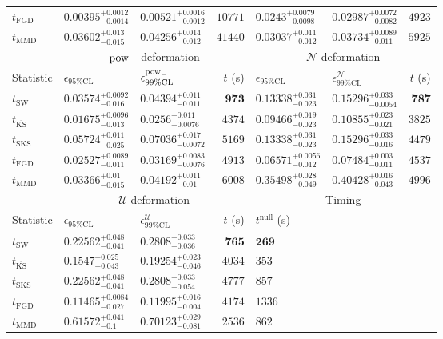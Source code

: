 \begin{tabular}{l|llr|llr}
	$t_{\mathrm{FGD}}$ & ${\mathbf{0.00395_{-0.0014}^{+0.0012}}}$ & ${\mathbf{0.00521_{-0.0012}^{+0.0016}}}$ & $10771$ & $0.0243_{-0.0098}^{+0.0079}$ & $0.02987_{-0.0082}^{+0.0072}$ & $4923$ \\
	$t_{\mathrm{MMD}}$ & $0.03602_{-0.015}^{+0.013}$ & $0.04256_{-0.012}^{+0.014}$ & $41440$ & $0.03037_{-0.012}^{+0.011}$ & $0.03734_{-0.011}^{+0.0089}$ & $5925$ \\
	\toprule
	\multicolumn{1}{c}{} & \multicolumn{3}{c}{$\rm{pow}_{-}$-deformation} & \multicolumn{3}{c}{$\mathcal{N}$-deformation} \\
	Statistic & $\epsilon_{95\%\mathrm{CL}}$ & $\epsilon^  {\rm{pow}_{-}}_{99\%\mathrm{CL}}$ & $t$ (s) & $\epsilon_{95\%\mathrm{CL}}$ & $\epsilon^    {\mathcal{N}}_{99\%\mathrm{CL}}$ & $t$ (s) \\
	\midrule
	$t_{\mathrm{SW}}$ & $0.03574_{-0.016}^{+0.0092}$ & $0.04394_{-0.011}^{+0.011}$ & ${\mathbf{973}}$ & $0.13338_{-0.023}^{+0.031}$ & $0.15296_{-0.0054}^{+0.033}$ & ${\mathbf{787}}$ \\
	$t_{\overline{\mathrm{KS}}}$ & ${\mathbf{0.01675_{-0.013}^{+0.0096}}}$ & ${\mathbf{0.0256_{-0.0076}^{+0.011}}}$ & $4374$ & $0.09466_{-0.023}^{+0.019}$ & $0.10855_{-0.021}^{+0.023}$ & $3825$ \\
	$t_{\mathrm{SKS}}$ & $0.05724_{-0.025}^{+0.011}$ & $0.07036_{-0.0072}^{+0.017}$ & $5169$ & $0.13338_{-0.023}^{+0.031}$ & $0.15296_{-0.016}^{+0.033}$ & $4479$ \\
	$t_{\mathrm{FGD}}$ & $0.02527_{-0.011}^{+0.0089}$ & $0.03169_{-0.0076}^{+0.0083}$ & $4913$ & ${\mathbf{0.06571_{-0.012}^{+0.0056}}}$ & ${\mathbf{0.07484_{-0.011}^{+0.003}}}$ & $4537$ \\
	$t_{\mathrm{MMD}}$ & $0.03366_{-0.015}^{+0.01}$ & $0.04192_{-0.01}^{+0.011}$ & $6008$ & $0.35498_{-0.049}^{+0.028}$ & $0.40428_{-0.043}^{+0.016}$ & $4996$ \\
	\toprule
	\multicolumn{1}{c}{} & \multicolumn{3}{c}{$\mathcal{U}$-deformation} & \multicolumn{3}{c}{Timing} \\
	Statistic & $\epsilon_{95\%\mathrm{CL}}$ & $\epsilon^    {\mathcal{U}}_{99\%\mathrm{CL}}$ & $t$ (s) & $t^{\mathrm{null}}$ (s) \\
	\midrule
	$t_{\mathrm{SW}}$ & $0.22562_{-0.041}^{+0.048}$ & $0.2808_{-0.036}^{+0.033}$ & ${\mathbf{765}}$ & ${\mathbf{269}}$ \\
	$t_{\overline{\mathrm{KS}}}$ & $0.1547_{-0.043}^{+0.025}$ & $0.19254_{-0.046}^{+0.023}$ & $4034$ & $353$ \\
	$t_{\mathrm{SKS}}$ & $0.22562_{-0.041}^{+0.048}$ & $0.2808_{-0.054}^{+0.033}$ & $4777$ & $857$ \\
	$t_{\mathrm{FGD}}$ & ${\mathbf{0.11465_{-0.027}^{+0.0084}}}$ & ${\mathbf{0.11995_{-0.004}^{+0.016}}}$ & $4174$ & $1336$ \\
	$t_{\mathrm{MMD}}$ & $0.61572_{-0.1}^{+0.041}$ & $0.70123_{-0.081}^{+0.029}$ & $2536$ & $862$ \\
	\bottomrule
\end{tabular}